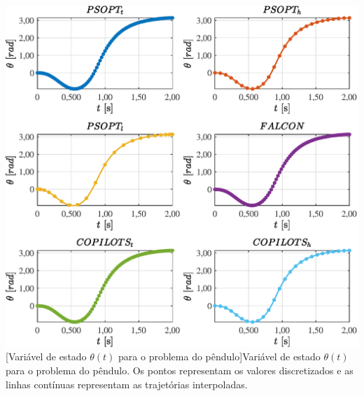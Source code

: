 \noindent
\begin{minipage}{\textwidth}
	\vspace{\onelineskip}
	\centering
	\includegraphics[scale=0.7]{fig/resultados/penduloInvertido/traj/x/theta}
	[Variável de estado $\theta(t)$ para o problema do pêndulo]{Variável de estado $\theta(t)$ para o problema do pêndulo. Os pontos representam os valores discretizados e as linhas contínuas representam as trajetórias interpoladas.}
	\label{fig:penduloInvertido:x:theta}
	\vspace{\onelineskip}
\end{minipage}

